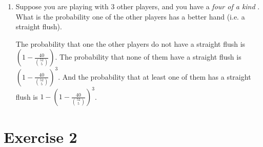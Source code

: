 \documentclass[12pt, a4paper]{article} %
\begin{document}
\begin{enumerate}[label=( \alph*)]
\begin{enumerate}[label=\textbullet]
    \end{enumerate}
  \item Suppose you are playing with 3 other players, and you have a \textit{four of a kind} . What is the probability one of the other players has a better hand (i.e. a straight flush).

    The probability that one the other players do not have a straight flush is $(1 - \frac{40}{\binom{52}{5}})$. The probability that none of them have a straight flush is $(1 - \frac{40}{\binom{52}{5}})^3$. And the probability that at least one of them has a straight flush is $1 - (1 - \frac{40}{\binom{52}{5}})^3$.
\end{enumerate}



\section*{Exercise 2}%
\label{sec:exercise_2}
\end{document}
